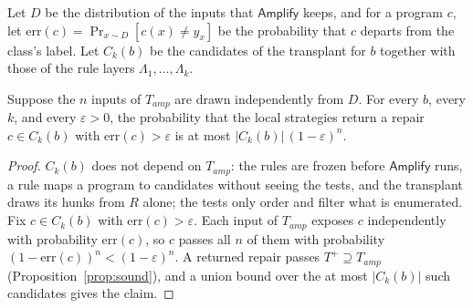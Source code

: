 \documentclass[acmsmall,screen,review,anonymous,nonacm]{acmart}
\newcommand{\aux}[1]{\ensuremath{\mathsf{#1}}}
\newcommand{\V}[1]{\ensuremath{\mathit{#1}}}
\begin{document}
Let $D$ be the distribution of the inputs that \aux{Amplify} keeps, and for a program $c$, let $\mathrm{err}(c) = \Pr_{x \sim D}[c(x) \neq y_x]$ be the probability that $c$ departs from the class's label. Let $C_k(b)$ be the candidates of the transplant for $b$ together with those of the rule layers $\Lambda_1, \dots, \Lambda_k$.
\begin{theorem}\label{thm:overfit}
Suppose the $n$ inputs of $T_{\V{amp}}$ are drawn independently from $D$. For every $b$, every $k$, and every $\varepsilon > 0$, the probability that the local strategies return a repair $c \in C_k(b)$ with $\mathrm{err}(c) > \varepsilon$ is at most $|C_k(b)|\,(1 - \varepsilon)^{n}$.
\end{theorem}
\begin{proof}
$C_k(b)$ does not depend on $T_{\V{amp}}$: the rules are frozen before \aux{Amplify} runs, a rule maps a program to candidates without seeing the tests, and the transplant draws its hunks from $R$ alone; the tests only order and filter what is enumerated. Fix $c \in C_k(b)$ with $\mathrm{err}(c) > \varepsilon$. Each input of $T_{\V{amp}}$ exposes $c$ independently with probability $\mathrm{err}(c)$, so $c$ passes all $n$ of them with probability $(1 - \mathrm{err}(c))^{n} < (1 - \varepsilon)^{n}$. A returned repair passes $T^{+} \supseteq T_{\V{amp}}$ (Proposition~\ref{prop:sound}), and a union bound over the at most $|C_k(b)|$ such candidates gives the claim.
\end{proof}
\end{document}
